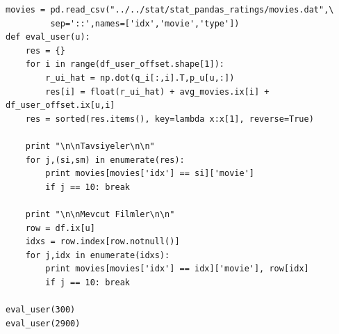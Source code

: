 \documentclass[12pt,fleqn]{article}\usepackage{../../common}
\begin{document}
\begin{verbatim}
movies = pd.read_csv("../../stat/stat_pandas_ratings/movies.dat",\
         sep='::',names=['idx','movie','type'])
def eval_user(u):
    res = {}
    for i in range(df_user_offset.shape[1]):
        r_ui_hat = np.dot(q_i[:,i].T,p_u[u,:])
        res[i] = float(r_ui_hat) + avg_movies.ix[i] + df_user_offset.ix[u,i]
    res = sorted(res.items(), key=lambda x:x[1], reverse=True)

    print "\n\nTavsiyeler\n\n"
    for j,(si,sm) in enumerate(res):
        print movies[movies['idx'] == si]['movie']
        if j == 10: break

    print "\n\nMevcut Filmler\n\n"
    row = df.ix[u]
    idxs = row.index[row.notnull()]
    for j,idx in enumerate(idxs):
        print movies[movies['idx'] == idx]['movie'], row[idx]
        if j == 10: break

eval_user(300)
eval_user(2900)
\end{verbatim}
\end{document}
